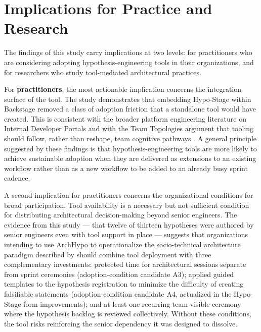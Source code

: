 \section{Implications for Practice and Research}
\label{sec:implications}

The findings of this study carry implications at two levels: for practitioners who are
considering adopting hypothesis-engineering tools in their organizations, and for
researchers who study tool-mediated architectural practices.

For \textbf{practitioners}, the most actionable implication concerns the integration
surface of the tool. The study demonstrates that embedding Hypo-Stage within Backstage 
removed a class of adoption friction that a standalone tool would have
created. This is consistent with the broader platform engineering literature on Internal
Developer Portals \citep{correa2025} and with the Team Topologies argument that tooling
should follow, rather than reshape, team cognitive pathways \citep{skelton2019}.
A general principle suggested by these findings is that hypothesis-engineering tools
are more likely to achieve sustainable adoption when they are delivered as extensions
to an existing workflow rather than as a new workflow to be added to an already busy
sprint cadence.

A second implication for practitioners concerns the organizational conditions for
broad participation. Tool availability is a necessary but not sufficient condition for
distributing architectural decision-making beyond senior engineers. The evidence from
this study --- that twelve of thirteen hypotheses were authored by senior
engineers even with tool support in place --- suggests that organizations intending to
use ArchHypo to operationalize the socio-technical architecture paradigm described by
\citet{infoq2024trends} should combine tool deployment with three complementary investments:
protected time for architectural sessions separate from sprint ceremonies
(adoption-condition candidate A3); applied guided templates to the hypothesis registration to minimize the difficulty of creating 
falsifiable statements (adoption-condition candidate A4, actualized in the Hypo-Stage
form improvements); and at least one recurring team-visible ceremony where the
hypothesis backlog is reviewed collectively. Without these conditions, the tool risks
reinforcing the senior dependency it was designed to dissolve.

